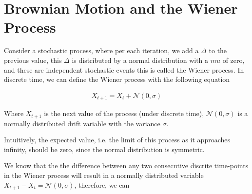 \documentclass{article}
\begin{document}
\doublespacing

\section{Brownian Motion and the Wiener Process}

Consider a stochastic process, where per each iteration, we add a $\Delta$ to the previous value,
this $\Delta$ is distributed by a normal distribution with a $mu$ of zero, and these are independent
stochastic events this is called the Wiener process. In discrete time, we can define the Wiener process
with the following equation

\begin{gather*}
    X_{t + 1} = X_{t} + \mathcal{N}(0, \sigma)
\end{gather*}

Where $X_{t + 1}$ is the next value of the process (under discrete time), $\mathcal{N}(0, \sigma)$
is a normally distributed drift variable with the variance $\sigma$.

Intuitively, the expected value, i.e. the limit of this process as it approaches infinity, should
be zero, since the normal distribution is symmetric.

We know that the the difference between any two consecutive discrite time-points in the Wiener process
will result in a normally distributed variable $X_{t + 1} - X_{t} = \mathcal{N}(0, \sigma)$, therefore,
we can 

\begin{gather*}

\end{gather*}
\end{document}
